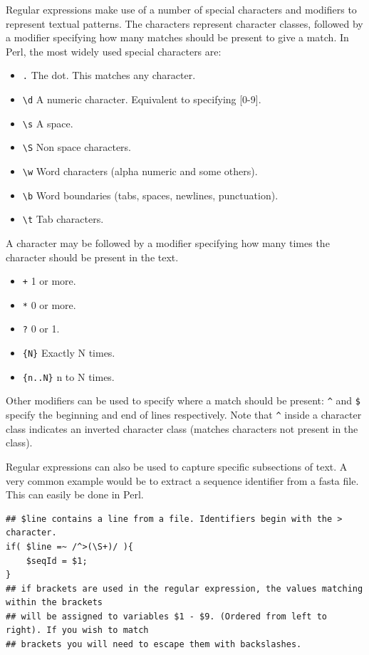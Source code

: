 \documentclass[11pt]{article}
\begin{document}
Regular expressions make use of a number of special characters and
modifiers to represent textual patterns. The characters represent
character classes, followed by a modifier specifying how many matches
should be present to give a match. In Perl, the most widely used special
characters are:

\begin{itemize}
\item \texttt{.} The dot. This matches any character.
\item \texttt{\textbackslash{}d} A numeric character. Equivalent to specifying [0-9].
\item \texttt{\textbackslash{}s} A space.
\item \texttt{\textbackslash{}S} Non space characters.
\item \texttt{\textbackslash{}w} Word characters (alpha numeric and some others).
\item \texttt{\textbackslash{}b} Word boundaries (tabs, spaces, newlines, punctuation).
\item \texttt{\textbackslash{}t} Tab characters.
\end{itemize}

A character may be followed by a modifier specifying how many times the
character should be present in the text.

\begin{itemize}
\item \texttt{+} 1 or more.
\item \texttt{*} 0 or more.
\item \texttt{?} 0 or 1.
\item \texttt{\{N\}} Exactly N times.
\item \texttt{\{n..N\}} n to N times.
\end{itemize}

Other modifiers can be used to specify where a match should be present:
\texttt{\textasciicircum{}} and \texttt{\$} specify the beginning and end of lines respectively. Note
that \texttt{\textasciicircum{}} inside a character class indicates an inverted character class
(matches characters not present in the class).

Regular expressions can also be used to capture specific subsections of
text. A very common example would be to extract a sequence identifier
from a fasta file. This can easily be done in Perl.


\begin{verbatim}
## $line contains a line from a file. Identifiers begin with the > character.
if( $line =~ /^>(\S+)/ ){
    $seqId = $1;
}
## if brackets are used in the regular expression, the values matching within the brackets
## will be assigned to variables $1 - $9. (Ordered from left to right). If you wish to match
## brackets you will need to escape them with backslashes.
\end{verbatim}
\end{document}
